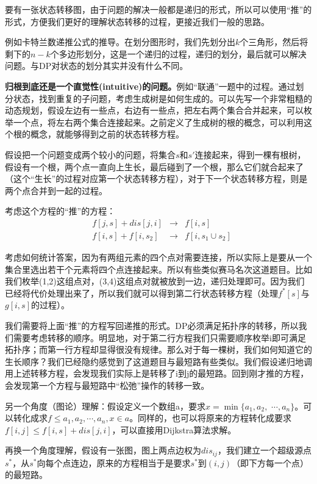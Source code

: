 要有一张状态转移图，由于问题的解决一般都是递归的形式，所以可以使用“推”的形式，方便我们更好的理解状态转移的过程，更接近我们一般的思路。

例如卡特兰数递推公式的推导。在划分图形时，我们先划分出$k$个三角形，然后将剩下的$n-k$个多边形划分，这是一个递归的过程，递归的划分，最后就可以解决问题。与DP对状态的划分其实并没有什么不同。

\textbf{归根到底还是一个直觉性(intuitive)的问题。}例如“联通”一题中的过程。通过划分状态，找到重复的子问题，考虑生成树是如何生成的。可以先写一个非常粗糙的动态规划，假设左边有一些点，右边有一些点，把左右两个集合合并起来，可以枚举一个点，将左右两个集合连接起来。之前定义了生成树的根的概念，可以利用这个根的概念，就能够得到之前的状态转移方程。

假设把一个问题变成两个较小的问题，将集合$s$和$s'$连接起来，得到一棵有根树，假设有一个根，两个点一直向上生长，最后碰到了一个根，那么它们就合起来了（这个“生长”的过程对应第一个状态转移方程），对于下一个状态转移方程，则是两个点合并到一起的过程。

考虑这个方程的“推”的方程：
\begin{equation*}
    \begin{aligned}
        &f[j,s]+dis[j,i]&\to& f[i,s]\\
        &f[i,s]+f[i,s_2]&\to& f[i,s_1\cup s_2]
    \end{aligned}
\end{equation*}

考虑如何统计答案，因为有两组元素的四个点对需要连接，所以实际上是要从一个集合里选出若干个元素将四个点连接起来。所以有些类似赛马名次这道题目。比如我们枚举(1,2)这组点对，(3,4)这组点对就被放到一边，递归处理即可。因为我们已经将代价处理出来了，所以我们就可以得到第二行状态转移方程（处理$f^*[s]$与$g[i,s]$的过程）。

我们需要将上面“推”的方程写回递推的形式。DP必须满足拓扑序的转移，所以我们需要考虑转移的顺序。明显地，对于第二行方程我们只需要顺序枚举i即可满足拓扑序；而第一行方程却显得很没有规律。那么对于每一棵树，我们如何知道它的生长顺序？我们已经隐约感觉到了这道题目与最短路有些类似。我们假设递归地调用上述转移方程，会发现我们实际上是转移了i到j的最短路。回到刚才推的方程，会发现第一个方程与最短路中“松弛”操作的转移一致。

另一个角度（图论）理解：假设定义一个数组a，要求$x=\min\{a_1,a_2,$ $\cdots,a_n\}$。可以转化成求$f\le a_1,a_2,\cdots,a_n,x\in a$。同样的，也可以将原来的方程转化成要求$f[i,j]\le f[i,s]+dis[j,i]$，可以直接用Dijkstra算法求解。

再换一个角度理解，假设有一张图，图上两点边权为$dis_{ij}$，我们建立一个超级源点$s^*$，从$s^*$向每个点连边，原来的方程相当于是要求$s^*$到$(i,j)$（即下方每一个点）的最短路。

